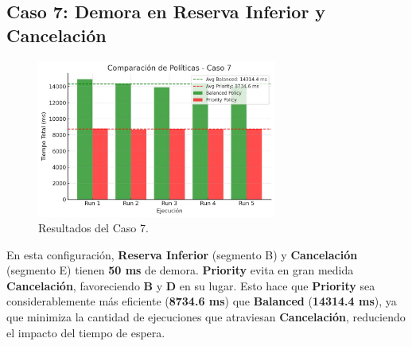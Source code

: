 \documentclass[12pt]{article}
\begin{document}
\subsection{Caso 7: Demora en Reserva Inferior y Cancelación}

\begin{figure}[H]
    \centering
    \includegraphics[width=0.7\textwidth]{CASO_7.jpeg}
    \caption{Resultados del Caso 7.}
\end{figure}

En esta configuración, \textbf{Reserva Inferior} (segmento B) y \textbf{Cancelación} (segmento E) tienen \textbf{50 ms} de demora. \textbf{Priority} evita en gran medida \textbf{Cancelación}, favoreciendo \textbf{B} y \textbf{D} en su lugar. Esto hace que \textbf{Priority} sea considerablemente más eficiente (\textbf{8734.6 ms}) que \textbf{Balanced} (\textbf{14314.4 ms}), ya que minimiza la cantidad de ejecuciones que atraviesan \textbf{Cancelación}, reduciendo el impacto del tiempo de espera.
\end{document}
